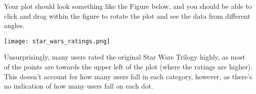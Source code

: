 \documentclass{ximera}
\begin{document}
\begin{exploration}
  Your plot should look something like the Figure below, and you should be able to click and drag within the figure to rotate the plot and see the data from different angles.

  \begin{center}
    \texttt{[image: star\_wars\_ratings.png]}
  \end{center}

  Unsurprisingly, many users rated the original Star Wars Trilogy highly, as most of the points are towards the upper left of the plot (where the ratings are higher). This doesn't account for how many users fall in each category, however, as there's no indication of how  many users fall on each dot. 

\end{exploration}
\end{document}
